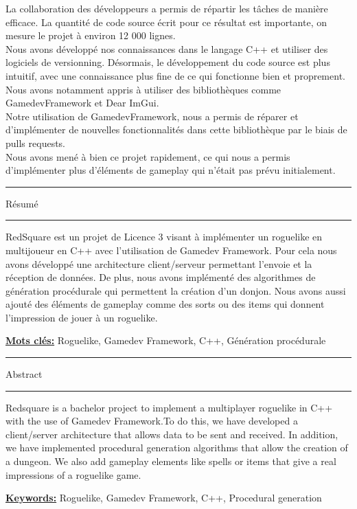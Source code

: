 \documentclass[a4paper, 12pt, twoside]{article}
\begin{document}
La collaboration des développeurs a permis de répartir les tâches de manière efficace.
La quantité de code source écrit pour ce résultat est importante, on mesure le projet
à environ 12 000 lignes.\\

Nous avons développé nos connaissances dans le langage C++ et utiliser des logiciels de versionning. Désormais, le développement du code source est plus intuitif, avec une connaissance plus fine de ce qui fonctionne bien et proprement. Nous avons notamment appris à utiliser des bibliothèques comme GamedevFramework et Dear ImGui.\\

Notre utilisation de GamedevFramework, nous a permis de réparer et d'implémenter de nouvelles fonctionnalités dans cette bibliothèque par le biais de pulls requests.\\ 

Nous avons mené à bien ce projet rapidement, ce qui nous a permis d'implémenter plus d'éléments de gameplay qui n'était pas prévu initialement.

\newpage

\listoffigures
\listoftables

\newpage
\hrule height 1pt
\begin{center}
\begin{Large}Résumé\end{Large}
\end{center}
\hrule height 1pt
\vskip 1cm
 
RedSquare est un projet de Licence 3 visant à implémenter un roguelike en multijoueur en C++ avec l'utilisation de Gamedev Framework. Pour cela nous avons développé une architecture client/serveur permettant l'envoie et la réception de données. De plus, nous avons implémenté des algorithmes de génération procédurale qui permettent la création d'un donjon. Nous avons aussi ajouté des éléments de gameplay comme des sorts ou des items qui donnent l'impression de jouer à un roguelike.
 
\vfil
\textbf{\underline{Mots clés:}} Roguelike, Gamedev Framework, C++, Génération procédurale
 
\vfil
\hrule height 1pt
\begin{center}
\begin{Large}Abstract\end{Large}
\end{center}
\hrule height 1pt
\vskip 1cm
 
Redsquare is a bachelor project to implement a multiplayer roguelike in C++ with the use of Gamedev Framework.To do this, we have developed a client/server architecture that allows data to be sent and received. In addition, we have implemented procedural generation algorithms that allow the creation of a dungeon. We also add gameplay elements like spells or items that give a real impressions of a roguelike game.
 
\vfil
\textbf{\underline{Keywords:}} Roguelike, Gamedev Framework, C++, Procedural generation
 
\thispagestyle{empty}
\end{document}
